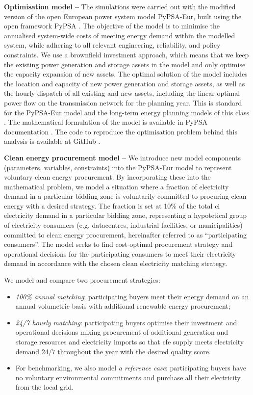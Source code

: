 \documentclass[11pt, 5p, nopreprintline]{elsarticle}
\begin{document}
\textbf{Optimisation model --} The simulations were carried out with the modified version of the open European power system model PyPSA-Eur, built using the open framework PyPSA \cite{brownPyPSAPythonPower2018}.
The objective of the model is to minimise the annualised system-wide costs of meeting energy demand within the modelled system, while adhering to all relevant engineering, reliability, and policy constraints.
We use a brownfield investment approach, which means that we keep the existing power generation and storage assets in the model and only optimise the capacity expansion of new assets.
The optimal solution of the model includes the location and capacity of new power generation and storage assets, as well as the hourly dispatch of all existing and new assets, including the linear optimal power flow on the transmission network for the planning year.
This is standard for the PyPSA-Eur model \cite{horschPyPSAEurOpenOptimisation2018} and the long-term energy planning models of this class \cite{jenkinsGenX2022, howellsOSeMOSYSOpenSource2011}.
The mathematical formulation of the model is available in PyPSA documentation \cite{pypsadocs}.
The code to reproduce the optimisation problem behind this analysis is available at GitHub \cite{github-247CFEpaper}.

\textbf{Clean energy procurement model --} We introduce new model components (parameters, variables, constraints) into the PyPSA-Eur model to represent voluntary clean energy procurement.
By incorporating these into the mathematical problem, we model a situation where a fraction of electricity demand in a particular bidding zone is voluntarily committed to procuring clean energy with a desired strategy.
The fraction is set at 10\% of the total \gls{ci} electricity demand in a particular bidding zone, representing a hypotetical group of electricity consumers (e.g. datacentres, industrial facilities, or municipalities) committed to clean energy procurement, hereinafter referred to as \enquote{participating consumers}.
The model seeks to find cost-optimal procurement strategy and operational decisions for the participating consumers to meet their electricity demand in accordance with the chosen clean electricity matching strategy.

We model and compare two procurement strategies:

\begin{itemize}[-]
    \item \textit{100\% annual matching}: participating buyers meet their energy demand on an annual volumetric basis with additional renewable energy procurement;
    \item \textit{24/7 hourly matching}: participating buyers optimise their investment and operational decisions mixing procurement of additional generation and storage resources and electricity imports so that \gls{cfe} supply meets electricity demand 24/7 throughout the year with the desired quality score.
    \item For benchmarking, we also model \textit{a reference case}: participating buyers have no voluntary environmental commitments and purchase all their electricity from the local grid.
\end{itemize}
\end{document}
